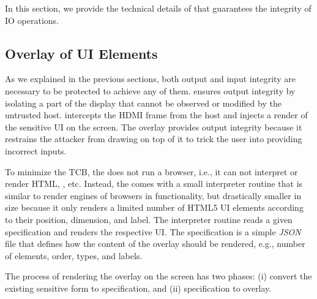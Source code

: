 In this section, we provide the technical details of \name that guarantees the integrity of IO operations.


\subsection{\device Overlay of UI Elements}
\label{sec:systemDesign:transformation}

As we explained in the previous sections, both output and input integrity are necessary to be protected to achieve any of them. \name ensures output integrity by isolating a part of the display that cannot be observed or modified by the untrusted host. \device intercepts the HDMI frame from the host and injects a render of the sensitive UI on the screen. The overlay provides output integrity because it restrains the attacker from drawing on top of it to trick the user into providing incorrect inputs. 

To minimize the TCB, the \device does not run a browser, i.e., it can not interpret or render HTML, \js, etc. Instead, the \device comes with a small interpreter routine that is similar to render engines of browsers in functionality, but drastically smaller in size because it only renders a limited number of HTML5 UI elements according to their position, dimension, and label. The interpreter routine reads a given specification and renders the respective UI. The specification is a simple \emph{JSON} file that defines how the content of the overlay should be rendered, e.g., number of elements, order, types, and labels. 

The process of rendering the overlay on the screen has two phases: (i) convert the existing sensitive form to specification, and (ii) specification to overlay.

